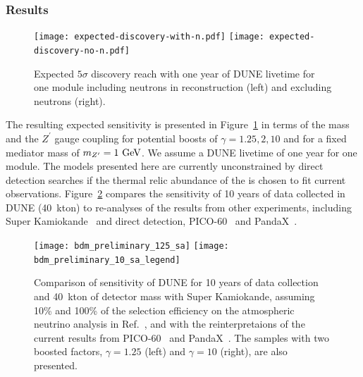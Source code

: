 \subsubsection{Results}

\begin{figure}[!htb]
\centering
\texttt{[image: expected-discovery-with-n.pdf]}\hspace{0.05\textwidth}
\texttt{[image: expected-discovery-no-n.pdf]}
\caption[Expected $5\sigma$ discovery reach with one year of DUNE livetime]{Expected $5\sigma$ discovery reach with one year of DUNE livetime for one \nominalmodsize module including neutrons in reconstruction (left) and excluding neutrons (right).\label{fig:significance}}
\end{figure}
The resulting expected sensitivity is presented in Figure~\ref{fig:significance} in terms of the  mass and the $Z^\prime$ gauge coupling for potential  boosts of $\gamma = 1.25,2,10$ and for a fixed mediator mass of $m_{Z^\prime} = 1~{\rm GeV}$.  We assume a DUNE livetime of one year for one \nominalmodsize module.  The models presented here are currently unconstrained by direct detection searches if the thermal relic abundance of the  is chosen to fit current observations.
Figure~\ref{fig:bdm_sensitivity_comparison} compares the sensitivity of 10 years of data collected in DUNE (40~kton) to re-analyses of the results from other experiments, including Super Kamiokande~\cite{Fechner:2009aa} and  direct detection, PICO-60~\cite{Amole:2019fdf} and PandaX~\cite{Xia:2018qgs}. 

\begin{figure}[!htb]
\centering
\texttt{[image: bdm\_preliminary\_125\_sa]}\hspace{0.05\textwidth}
\texttt{[image: bdm\_preliminary\_10\_sa\_legend]}
\caption[Comparison of DUNE (10 yr) sensitivity to \superk sensitivity]{Comparison of sensitivity of DUNE for 10 years of data collection and 40~kton of detector mass with Super Kamiokande, assuming 10\% and 100\% of the selection efficiency on the atmospheric neutrino analysis in Ref.~\cite{Fechner:2009aa}, and with the reinterpretaions of the current results from PICO-60~\cite{Amole:2019fdf} and PandaX~\cite{Xia:2018qgs}.  The samples with two boosted factors, $\gamma = 1.25$ (left) and $\gamma = 10$ (right), are also presented. \label{fig:bdm_sensitivity_comparison}}
\end{figure}

